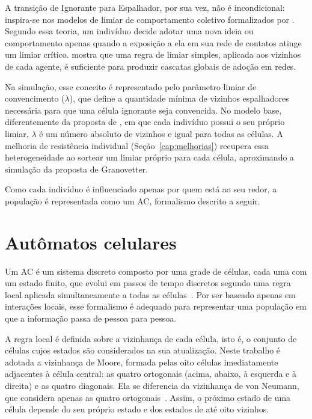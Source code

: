 A transição de Ignorante para Espalhador, por sua vez, não é incondicional: inspira-se nos modelos de limiar de comportamento coletivo formalizados por . Segundo essa teoria, um indivíduo decide adotar uma nova ideia ou comportamento apenas quando a exposição a ela em sua rede de contatos atinge um limiar crítico.  mostra que uma regra de limiar simples, aplicada aos vizinhos de cada agente, é suficiente para produzir cascatas globais de adoção em redes.

Na simulação, esse conceito é representado pelo parâmetro limiar de convencimento ($\lambda$), que define a quantidade mínima de vizinhos espalhadores necessária para que uma célula ignorante seja convencida. No modelo base, diferentemente da proposta de , em que cada indivíduo possui o seu próprio limiar, $\lambda$ é um número absoluto de vizinhos e igual para todas as células. A melhoria de resistência individual (Seção~\ref{cap:melhorias}) recupera essa heterogeneidade ao sortear um limiar próprio para cada célula, aproximando a simulação da proposta de Granovetter.

Como cada indivíduo é influenciado apenas por quem está ao seu redor, a população é representada como um \ac{AC}, formalismo descrito a seguir.

\section{Autômatos celulares}\label{sec:automatos-celulares}

Um \ac{AC} é um sistema discreto composto por uma grade de células, cada uma com um estado finito, que evolui em passos de tempo discretos segundo uma regra local aplicada simultaneamente a todas as células~\cite{Wolfram1983,BertoTagliabue2023}. Por ser baseado apenas em interações locais, esse formalismo é adequado para representar uma população em que a informação passa de pessoa para pessoa.

A regra local é definida sobre a vizinhança de cada célula, isto é, o conjunto de células cujos estados são considerados na sua atualização. Neste trabalho é adotada a vizinhança de Moore, formada pelas oito células imediatamente adjacentes à célula central: as quatro ortogonais (acima, abaixo, à esquerda e à direita) e as quatro diagonais. Ela se diferencia da vizinhança de von Neumann, que considera apenas as quatro ortogonais~\cite{BertoTagliabue2023}. Assim, o próximo estado de uma célula depende do seu próprio estado e dos estados de até oito vizinhos.

